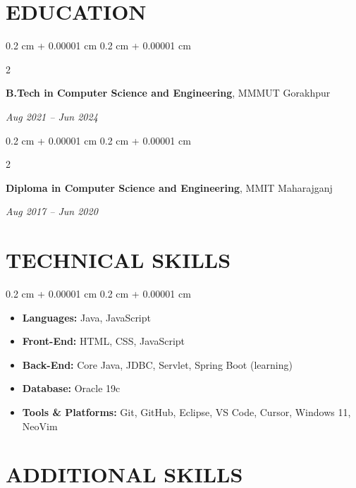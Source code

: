 \documentclass[10pt, letterpaper]{article}
\newenvironment{onecolentry}{
    \begin{adjustwidth}{
        0.2 cm + 0.00001 cm
    }{
        0.2 cm + 0.00001 cm
    }
}{
    \end{adjustwidth}
}
\newenvironment{twocolentry}[2][]{
    \onecolentry
    \def\secondColumn{#2}
    \setcolumnwidth{\fill, 4.5 cm}
    \begin{paracol}{2}
}{
    \switchcolumn \raggedleft \secondColumn
    \end{paracol}
    \endonecolentry
}
\begin{document}
    \vspace{0.2 cm}
    
    \section{EDUCATION}

    \begin{twocolentry}{\textit{Aug 2021 – Jun 2024}}
        \textbf{B.Tech in Computer Science and Engineering}, MMMUT Gorakhpur
    \end{twocolentry}
    
    \vspace{0.2 cm}
    
    \begin{twocolentry}{\textit{Aug 2017 – Jun 2020}}
        \textbf{Diploma in Computer Science and Engineering}, MMIT Maharajganj
    \end{twocolentry}
    
    \vspace{0.2 cm}
    
    \section{TECHNICAL SKILLS}

    \begin{onecolentry}
        \begin{itemize}[leftmargin=*,noitemsep,topsep=0pt]
            \item \textbf{Languages:} Java, JavaScript
            \item \textbf{Front-End:} HTML, CSS, JavaScript
            \item \textbf{Back-End:} Core Java, JDBC, Servlet, Spring Boot (learning)
            \item \textbf{Database:} Oracle 19c
            \item \textbf{Tools \& Platforms:} Git, GitHub, Eclipse, VS Code, Cursor, Windows 11, NeoVim
        \end{itemize}
    \end{onecolentry}
    
    \vspace{0.2 cm}
    
    \section{ADDITIONAL SKILLS}
    
\end{document}
